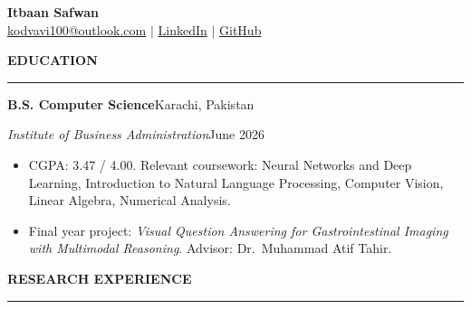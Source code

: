 \documentclass[11pt,letterpaper]{article}
\newcommand{\cvsection}[1]{%
  \Needspace*{6\baselineskip}%
  \vspace{1.0em}%
  {\bfseries\uppercase{#1}}\par
  \vspace{0.15em}\hrule\vspace{0.5em}%
}
\newenvironment{entrybox}
  {\par\vspace{0.5em}\noindent\begin{minipage}{\linewidth}}
  {\end{minipage}\par}
\newcommand{\orgline}[2]{\textbf{#1}\hfill #2\par}
\newcommand{\roleline}[2]{\textit{#1}\hfill #2\par\vspace{0.15em}}
\begin{document}
\begin{center}
  {\fontsize{20}{24}\selectfont\bfseries Itbaan Safwan}\\[0.5em]
  \href{mailto:kodvavi100@outlook.com}{kodvavi100@outlook.com} $\vert$
  \href{https://www.linkedin.com/in/itbaan-safwan-845213254}{LinkedIn} $\vert$
  \href{https://github.com/itbaans}{GitHub}
\end{center}

\cvsection{Education}

\begin{entrybox}
  \orgline{B.S. Computer Science}{Karachi, Pakistan}
  \roleline{Institute of Business Administration}{June 2026}
  \begin{itemize}
    \item CGPA: 3.47 / 4.00. Relevant coursework: Neural Networks and Deep Learning,
          Introduction to Natural Language Processing, Computer Vision, Linear Algebra,
          Numerical Analysis.
    \item Final year project: \textit{Visual Question Answering for Gastrointestinal Imaging with
          Multimodal Reasoning}. Advisor: Dr.\ Muhammad Atif Tahir.
  \end{itemize}
\end{entrybox}

\cvsection{Research Experience}
\end{document}

